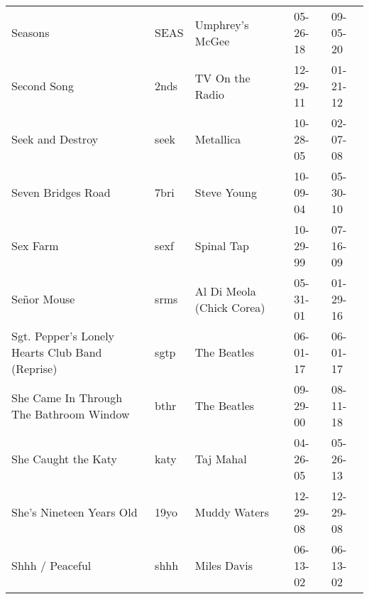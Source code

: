 \begin{longtable}{p{}p{}p{}p{}p{}}
                                                                 Seasons &          SEAS &                                          Umphrey's McGee &              05-26-18 &             09-05-20 \\
                                                             Second Song &          2nds &                                          TV On the Radio &              12-29-11 &             01-21-12 \\
                                                        Seek and Destroy &          seek &                                                Metallica &              10-28-05 &             02-07-08 \\
                                                      Seven Bridges Road &          7bri &                                              Steve Young &              10-09-04 &             05-30-10 \\
                                                                Sex Farm &          sexf &                                               Spinal Tap &              10-29-99 &             07-16-09 \\
                                                             Señor Mouse &          srms &                                Al Di Meola (Chick Corea) &              05-31-01 &             01-29-16 \\
                         Sgt. Pepper's Lonely Hearts Club Band (Reprise) &          sgtp &                                              The Beatles &              06-01-17 &             06-01-17 \\
                                 She Came In Through The Bathroom Window &          bthr &                                              The Beatles &              09-29-00 &             08-11-18 \\
                                                     She Caught the Katy &          katy &                                                Taj Mahal &              04-26-05 &             05-26-13 \\
                                                She's Nineteen Years Old &          19yo &                                             Muddy Waters &              12-29-08 &             12-29-08 \\
                                                         Shhh / Peaceful &          shhh &                                              Miles Davis &              06-13-02 &             06-13-02 \\

\end{longtable}
